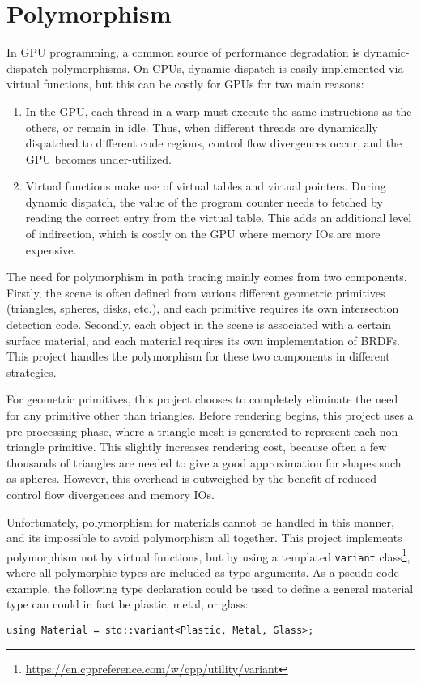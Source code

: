\section{Polymorphism}
In GPU programming, a common source of performance degradation is dynamic-dispatch polymorphisms. On CPUs, dynamic-dispatch is easily implemented via virtual functions, but this can be costly for GPUs for two main reasons:
\begin{enumerate}
    \item In the GPU, each thread in a warp must execute the same instructions as the others, or remain in idle. Thus, when different threads are dynamically dispatched to different code regions, control flow divergences occur, and the GPU becomes under-utilized.
    
    \item Virtual functions make use of virtual tables and virtual pointers. During dynamic dispatch, the value of the program counter needs to fetched by reading the correct entry from the virtual table. This adds an additional level of indirection, which is costly on the GPU where memory IOs are more expensive.
    
\end{enumerate}
The need for polymorphism in path tracing mainly comes from two components. Firstly, the scene is often defined from various different geometric primitives (triangles, spheres, disks, etc.), and each primitive requires its own intersection detection code. Secondly, each object in the scene is associated with a certain surface material, and each material requires its own implementation of BRDFs. This project handles the polymorphism for these two components in different strategies.

For geometric primitives, this project chooses to completely eliminate the need for any primitive other than triangles. Before rendering begins, this project uses a pre-processing phase, where a triangle mesh is generated to represent each non-triangle primitive. This slightly increases rendering cost, because often a few thousands of triangles are needed to give a good approximation for shapes such as spheres. However, this overhead is outweighed by the benefit of reduced control flow divergences and memory IOs.

Unfortunately, polymorphism for materials cannot be handled in this manner, and its impossible to avoid polymorphism all together. This project implements polymorphism not by virtual functions, but by using a templated \texttt{variant} class\footnote{\url{https://en.cppreference.com/w/cpp/utility/variant}}, where all polymorphic types are included as type arguments. As a pseudo-code example, the following type declaration could be used to define a general material type can could in fact be plastic, metal, or glass:
\begin{lstlisting}[style=cppStyle]
using Material = std::variant<Plastic, Metal, Glass>;
\end{lstlisting}

